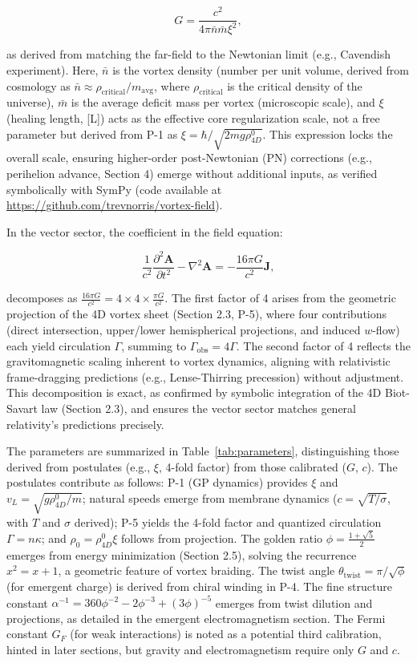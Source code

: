 \[
G = \frac{c^2}{4\pi \bar{n} \bar{m} \xi^2},
\]

as derived from matching the far-field to the Newtonian limit (e.g., Cavendish experiment). Here, $\bar{n}$ is the vortex density (number per unit volume, derived from cosmology as $\bar{n} \approx \rho_{\text{critical}} / m_{\text{avg}}$, where $\rho_{\text{critical}}$ is the critical density of the universe), $\bar{m}$ is the average deficit mass per vortex (microscopic scale), and $\xi$ (healing length, [L]) acts as the effective core regularization scale, not a free parameter but derived from P-1 as $\xi = \hbar / \sqrt{2 m g \rho_{4D}^0}$. This expression locks the overall scale, ensuring higher-order post-Newtonian (PN) corrections (e.g., perihelion advance, Section 4) emerge without additional inputs, as verified symbolically with SymPy (code available at \url{https://github.com/trevnorris/vortex-field}).

In the vector sector, the coefficient in the field equation:

\[
\frac{1}{c^2} \frac{\partial^2 \mathbf{A}}{\partial t^2} - \nabla^2 \mathbf{A} = -\frac{16\pi G}{c^2} \mathbf{J},
\]

decomposes as $\frac{16\pi G}{c^2} = 4 \times 4 \times \frac{\pi G}{c^2}$. The first factor of 4 arises from the geometric projection of the 4D vortex sheet (Section 2.3, P-5), where four contributions (direct intersection, upper/lower hemispherical projections, and induced $w$-flow) each yield circulation $\Gamma$, summing to $\Gamma_{\text{obs}} = 4\Gamma$. The second factor of 4 reflects the gravitomagnetic scaling inherent to vortex dynamics, aligning with relativistic frame-dragging predictions (e.g., Lense-Thirring precession) without adjustment. This decomposition is exact, as confirmed by symbolic integration of the 4D Biot-Savart law (Section 2.3), and ensures the vector sector matches general relativity's predictions precisely.

The parameters are summarized in Table~\ref{tab:parameters}, distinguishing those derived from postulates (e.g., $\xi$, 4-fold factor) from those calibrated ($G$, $c$). The postulates contribute as follows: P-1 (GP dynamics) provides $\xi$ and $v_L = \sqrt{g \rho_{4D}^0 / m}$; natural speeds emerge from membrane dynamics ($c = \sqrt{T / \sigma}$, with $T$ and $\sigma$ derived); P-5 yields the 4-fold factor and quantized circulation $\Gamma = n \kappa$; and $\rho_0 = \rho_{4D}^0 \xi$ follows from projection. The golden ratio $\phi = \frac{1 + \sqrt{5}}{2}$ emerges from energy minimization (Section 2.5), solving the recurrence $x^2 = x + 1$, a geometric feature of vortex braiding. The twist angle $\theta_{\text{twist}} = \pi / \sqrt{\phi}$ (for emergent charge) is derived from chiral winding in P-4. The fine structure constant $\alpha^{-1} = 360 \phi^{-2} - 2 \phi^{-3} + (3 \phi)^{-5}$ emerges from twist dilution and projections, as detailed in the emergent electromagnetism section. The Fermi constant $G_F$ (for weak interactions) is noted as a potential third calibration, hinted in later sections, but gravity and electromagnetism require only $G$ and $c$.

